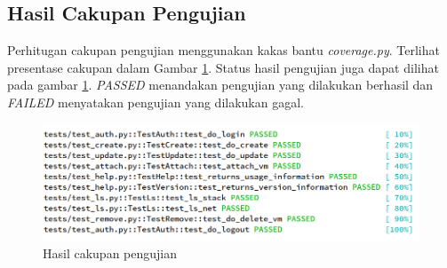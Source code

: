 \subsection{Hasil Cakupan Pengujian}

Perhitugan cakupan pengujian menggunakan kakas bantu
\emph{coverage.py}. Terlihat presentase cakupan dalam Gambar
\ref{fig:test-akhir}. Status hasil pengujian juga dapat dilihat pada
gambar \ref{fig:test-akhir}.  \emph{PASSED} menandakan pengujian yang
dilakukan berhasil dan \emph{FAILED} menyatakan pengujian yang
dilakukan gagal.

\begin{figure}[H]
  \centering
  \includegraphics[width=.99\linewidth]{img/test-akhir}
  \caption{Hasil cakupan pengujian}
  \label{fig:test-akhir}
\end{figure}

